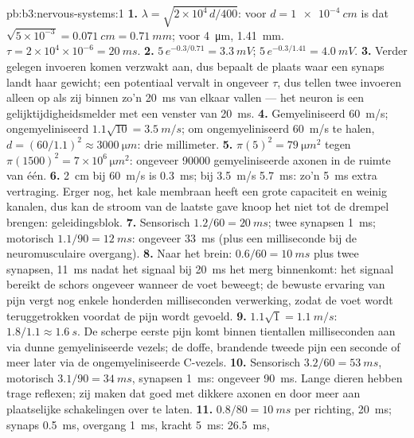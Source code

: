 \begin{solution}{pb:b3:nervous-systems:1}
\textbf{1.} $\lambda = \sqrt{2\times 10^{4}\,d/400}$: voor $d =
\qty{1e-4}{cm}$ is dat $\sqrt{5\times 10^{-3}} = \qty{0.071}{cm} =
\qty{0.71}{mm}$; voor \qty{4}{\micro m}, \qty{1.41}{mm}. $\tau = 2\times
10^{4}\times 10^{-6} = \qty{20}{ms}$.
\textbf{2.} $5\,e^{-0.3/0.71} = \qty{3.3}{mV}$; $5\,e^{-0.3/1.41} =
\qty{4.0}{mV}$.
\textbf{3.} Verder gelegen invoeren komen verzwakt aan, dus bepaalt de
plaats waar een synaps landt haar gewicht; een potentiaal vervalt in
ongeveer $\tau$, dus tellen twee invoeren alleen op als zij binnen zo'n
\qty{20}{ms} van elkaar vallen --- het neuron is een
gelijktijdigheidsmelder met een venster van \qty{20}{ms}.
\textbf{4.} Gemyeliniseerd \qty{60}{m/s}; ongemyeliniseerd $1.1\sqrt{10} =
\qty{3.5}{m/s}$; om ongemyeliniseerd \qty{60}{m/s} te halen, $d = (60/1.1)^{2}
\approx \qty{3000}{\micro m}$: drie millimeter.
\textbf{5.} $\pi(5)^{2} = \qty{79}{\micro m^2}$ tegen $\pi(1500)^{2} =
7\times 10^{6}\,\unit{\micro m^2}$: ongeveer \num{90000} gemyeliniseerde
axonen in de ruimte van één.
\textbf{6.} \qty{2}{cm} bij \qty{60}{m/s} is \qty{0.3}{ms}; bij
\qty{3.5}{m/s} \qty{5.7}{ms}: zo'n \qty{5}{ms} extra vertraging. Erger
nog, het kale membraan heeft een grote capaciteit en weinig kanalen,
dus kan de stroom van de laatste gave knoop het niet tot de drempel
brengen: geleidingsblok.
\textbf{7.} Sensorisch $1.2/60 = \qty{20}{ms}$; twee synapsen
\qty{1}{ms}; motorisch $1.1/90 = \qty{12}{ms}$: ongeveer \qty{33}{ms}
(plus een milliseconde bij de neuromusculaire overgang).
\textbf{8.} Naar het brein: $0.6/60 = \qty{10}{ms}$ plus twee synapsen,
\qty{11}{ms} nadat het signaal bij \qty{20}{ms} het merg binnenkomt: het
signaal bereikt de schors ongeveer wanneer de voet beweegt; de bewuste
ervaring van pijn vergt nog enkele honderden milliseconden verwerking,
zodat de voet wordt teruggetrokken voordat de pijn wordt gevoeld.
\textbf{9.} $1.1\sqrt{1} = \qty{1.1}{m/s}$: $1.8/1.1 \approx
\qty{1.6}{s}$. De scherpe eerste pijn komt binnen tientallen
milliseconden aan via dunne gemyeliniseerde vezels; de doffe, brandende
tweede pijn een seconde of meer later via de ongemyeliniseerde
C-vezels.
\textbf{10.} Sensorisch $3.2/60 = \qty{53}{ms}$, motorisch $3.1/90 =
\qty{34}{ms}$, synapsen \qty{1}{ms}: ongeveer \qty{90}{ms}. Lange
dieren hebben trage reflexen; zij maken dat goed met dikkere axonen en
door meer aan plaatselijke schakelingen over te laten.
\textbf{11.} $0.8/80 = \qty{10}{ms}$ per richting, \qty{20}{ms}; synaps
\qty{0.5}{ms}, overgang \qty{1}{ms}, kracht \qty{5}{ms}: \qty{26.5}{ms},

\end{solution}
